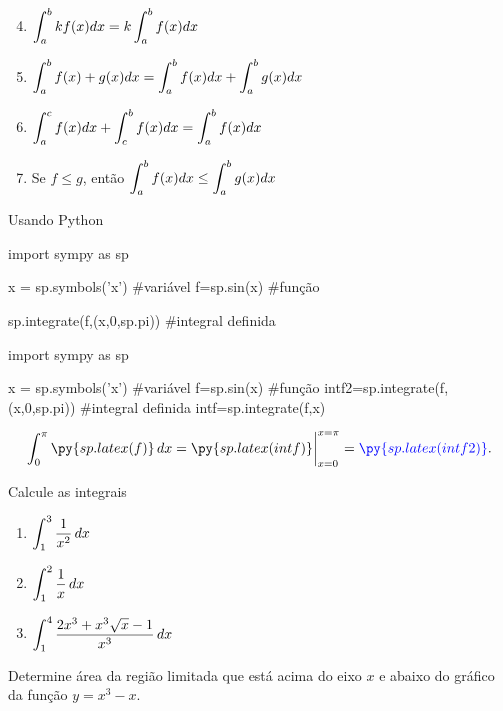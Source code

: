 \begin{frame}[label=def_integral]


\begin{enumerate}
\setcounter{enumi}{3}
\item $\displaystyle \int_a^b kf(x)dx=k\int_a^b f(x)dx$
\item $\displaystyle \int_a^b f(x)+g(x)dx=\int_a^b f(x)dx+\int_a^b g(x)dx$
\item $\displaystyle \int_a^c f(x)dx+\int_c^b f(x)dx=\int_a^b f(x)dx$
\item  Se $f\leq g$, então $\displaystyle \int_a^b f(x)dx\leq \int_a^b g(x)dx$
\end{enumerate}

\end{frame}




\begin{frame}[label=def_integral, fragile=singleslide]{Usando Python}
\begin{block}{ }
\begin{pyverbatim}
import sympy as sp

x = sp.symbols('x') #variável
f=sp.sin(x) #função

sp.integrate(f,(x,0,sp.pi)) #integral definida
\end{pyverbatim}
\end{block}
\begin{pycode}
import sympy as sp

x = sp.symbols('x') #variável
f=sp.sin(x) #função
intf2=sp.integrate(f,(x,0,sp.pi)) #integral definida
intf=sp.integrate(f,x)
\end{pycode}

\[\dps \int_0^\pi \py{sp.latex(f)}\, dx=\py{sp.latex(intf)}\bigg\vert_{x=0}^{x=\pi}={\color{blue}\py{sp.latex(intf2)}}.\]
\end{frame}




\begin{frame}[label=def_integral]
	\begin{casa}
 Calcule as integrais
\begin{enumerate}[a]
	\item $\displaystyle\int_1^3\frac{1}{x^2}\,dx$
	\item $\displaystyle\int_1^2\frac{1}{x}\,dx$
	\item $\displaystyle\int_{1}^{4} \frac{2x^
	3+x^3\sqrt{x}-1}{x^3}\,dx$
\end{enumerate}
	\end{casa}

\begin{casa}
Determine área da região limitada que está acima do eixo $x$ e abaixo do gráfico da função $y=x^3-x$.
\end{casa}
\end{frame}

